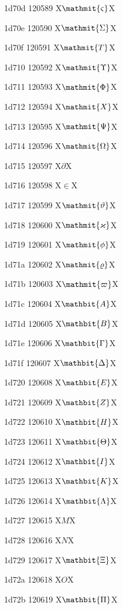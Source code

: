 \documentclass[11pt]{article}
\begin{document}
1d70d 120589 X{\ensuremath{\mathmit{\varsigma}}}X

1d70e 120590 X{\ensuremath{\mathmit{\Sigma}}}X

1d70f 120591 X{\ensuremath{\mathmit{T}}}X

1d710 120592 X{\ensuremath{\mathmit{\Upsilon}}}X

1d711 120593 X{\ensuremath{\mathmit{\Phi}}}X

1d712 120594 X{\ensuremath{\mathmit{X}}}X

1d713 120595 X{\ensuremath{\mathmit{\Psi}}}X

1d714 120596 X{\ensuremath{\mathmit{\Omega}}}X

1d715 120597 X{\ensuremath{\partial}}X

1d716 120598 X{\ensuremath{\in}}X

1d717 120599 X{\ensuremath{\mathmit{\vartheta}}}X

1d718 120600 X{\ensuremath{\mathmit{\varkappa}}}X

1d719 120601 X{\ensuremath{\mathmit{\phi}}}X

1d71a 120602 X{\ensuremath{\mathmit{\varrho}}}X

1d71b 120603 X{\ensuremath{\mathmit{\varpi}}}X

1d71c 120604 X{\ensuremath{\mathbit{A}}}X

1d71d 120605 X{\ensuremath{\mathbit{B}}}X

1d71e 120606 X{\ensuremath{\mathbit{\Gamma}}}X

1d71f 120607 X{\ensuremath{\mathbit{\Delta}}}X

1d720 120608 X{\ensuremath{\mathbit{E}}}X

1d721 120609 X{\ensuremath{\mathbit{Z}}}X

1d722 120610 X{\ensuremath{\mathbit{H}}}X

1d723 120611 X{\ensuremath{\mathbit{\Theta}}}X

1d724 120612 X{\ensuremath{\mathbit{I}}}X

1d725 120613 X{\ensuremath{\mathbit{K}}}X

1d726 120614 X{\ensuremath{\mathbit{\Lambda}}}X

1d727 120615 X{\ensuremath{M}}X

1d728 120616 X{\ensuremath{N}}X

1d729 120617 X{\ensuremath{\mathbit{\Xi}}}X

1d72a 120618 X{\ensuremath{O}}X

1d72b 120619 X{\ensuremath{\mathbit{\Pi}}}X
\end{document}
